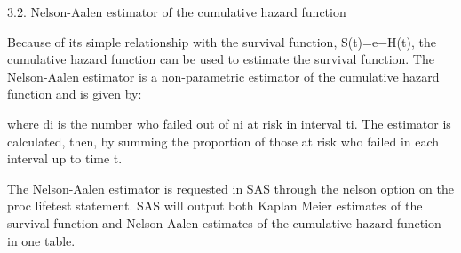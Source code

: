3.2. Nelson-Aalen estimator of the cumulative hazard function

Because of its simple relationship with the survival function, S(t)=e−H(t), the cumulative hazard function can be used to estimate the survival function. The Nelson-Aalen estimator is a non-parametric estimator of the cumulative hazard function and is given by:

where di is the number who failed out of ni at risk in interval ti. The estimator is calculated, then, by summing the proportion of those at risk who failed in each interval up to time t.

The Nelson-Aalen estimator is requested in SAS through the nelson option on the proc lifetest statement. SAS will output both Kaplan Meier estimates of the survival function and Nelson-Aalen estimates of the cumulative hazard function in one table.
